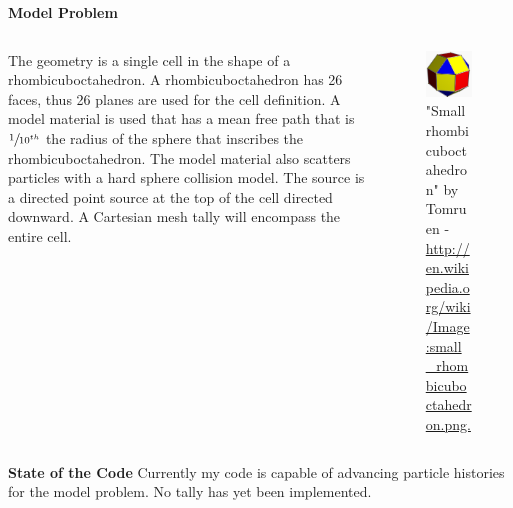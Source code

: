 \documentclass{beamer}
\begin{document}
\begin{frame}[t,fragile]{}
\begin{columns}[t,totalwidth=\textwidth]
\begin{column}{0.310\textwidth}
\begin{block}{\LARGE\textbf{Model Problem}}
\begin{columns}[c,totalwidth=\textwidth]
\begin{column}{0.6\textwidth}
The geometry is a single cell in the shape of a rhombicuboctahedron.
A rhombicuboctahedron has 26 faces, thus 26 planes are used for the cell definition.
A model material is used that has a mean free path that is $\sfrac{1}{10^{th}}$ the radius of the
sphere that inscribes the rhombicuboctahedron.
The model material also scatters particles with a hard sphere collision model.
The source is a directed point source at the top of the cell directed downward.
A Cartesian mesh tally will encompass the entire cell.
\end{column}
\begin{column}{0.4\textwidth}
\begin{figure}
\includegraphics[width=0.9\linewidth]{Small_rhombicuboctahedron.png}
\caption{\small "Small rhombicuboctahedron" by Tomruen - \url{http://en.wikipedia.org/wiki/Image:small_rhombicuboctahedron.png.}}
\end{figure}
\end{column}
\end{columns}
\end{block}

\begin{block}{\LARGE\textbf{State of the Code}}
Currently my code is capable of advancing particle histories for the model problem.
No tally has yet been implemented.
\end{block}


\end{column}
\end{columns}
\end{frame}
\end{document}
